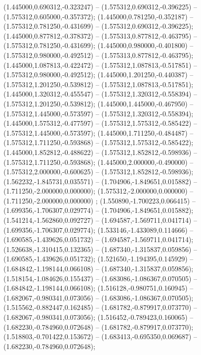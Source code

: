  (1.445000,0.690312,-0.323247) -- (1.575312,0.690312,-0.396225) -- (1.575312,0.605000,-0.357372);
 (1.445000,0.781250,-0.352187) -- (1.575312,0.781250,-0.431699) -- (1.575312,0.690312,-0.396225);
 (1.445000,0.877812,-0.378372) -- (1.575313,0.877812,-0.463795) -- (1.575312,0.781250,-0.431699);
 (1.445000,0.980000,-0.401800) -- (1.575312,0.980000,-0.492512) -- (1.575313,0.877812,-0.463795);
 (1.445000,1.087813,-0.422472) -- (1.575312,1.087813,-0.517851) -- (1.575312,0.980000,-0.492512);
 (1.445000,1.201250,-0.440387) -- (1.575312,1.201250,-0.539812) -- (1.575312,1.087813,-0.517851);
 (1.445000,1.320312,-0.455547) -- (1.575312,1.320312,-0.558394) -- (1.575312,1.201250,-0.539812);
 (1.445000,1.445000,-0.467950) -- (1.575312,1.445000,-0.573597) -- (1.575312,1.320312,-0.558394);
 (1.445000,1.575312,-0.477597) -- (1.575312,1.575312,-0.585422) -- (1.575312,1.445000,-0.573597);
 (1.445000,1.711250,-0.484487) -- (1.575312,1.711250,-0.593868) -- (1.575312,1.575312,-0.585422);
 (1.445000,1.852812,-0.488622) -- (1.575312,1.852812,-0.598936) -- (1.575312,1.711250,-0.593868);
 (1.445000,2.000000,-0.490000) -- (1.575312,2.000000,-0.600625) -- (1.575312,1.852812,-0.598936);
 (1.562232,-1.845731,0.035571) -- (1.704906,-1.849651,0.015882) -- (1.711250,-2.000000,0.000000);
 (1.575312,-2.000000,0.000000) -- (1.711250,-2.000000,0.000000) ;
 (1.550890,-1.700223,0.066415) -- (1.699356,-1.706307,0.029774) -- (1.704906,-1.849651,0.015882);
 (1.541214,-1.562860,0.092727) -- (1.694587,-1.569711,0.041714) -- (1.699356,-1.706307,0.029774);
 (1.533146,-1.433089,0.114666) -- (1.690585,-1.439626,0.051732) -- (1.694587,-1.569711,0.041714);
 (1.526638,-1.310415,0.132365) -- (1.687340,-1.315837,0.059856) -- (1.690585,-1.439626,0.051732);
 (1.521650,-1.194395,0.145929) -- (1.684842,-1.198144,0.066108) -- (1.687340,-1.315837,0.059856);
 (1.518154,-1.084626,0.155437) -- (1.683086,-1.086367,0.070505) -- (1.684842,-1.198144,0.066108);
 (1.516128,-0.980751,0.160945) -- (1.682067,-0.980341,0.073056) -- (1.683086,-1.086367,0.070505);
 (1.515562,-0.882447,0.162485) -- (1.681782,-0.879917,0.073770) -- (1.682067,-0.980341,0.073056);
 (1.516452,-0.789423,0.160065) -- (1.682230,-0.784960,0.072648) -- (1.681782,-0.879917,0.073770);
 (1.518803,-0.701422,0.153672) -- (1.683413,-0.695350,0.069687) -- (1.682230,-0.784960,0.072648);
